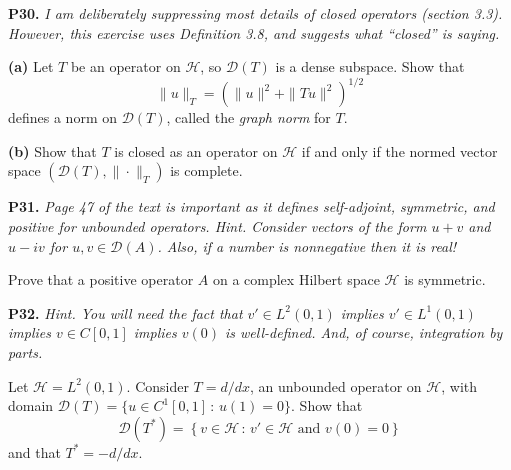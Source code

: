 \documentclass[12pt]{amsart}
\newcommand{\cD}{\mathcal{D}}
\newcommand{\cH}{\mathcal{H}}
\newcommand{\prob}[1]{\bigskip\noindent\textbf{#1.}\quad }
\newcommand{\epart}[1]{\medskip\noindent\textbf{(#1)}\quad }
\begin{document}
\prob{P30} \emph{I am deliberately suppressing most details of \emph{closed} operators (section 3.3).  However, this exercise uses Definition 3.8, and suggests what ``closed'' is saying.}

\epart{a} Let $T$ be an operator on $\cH$, so $\cD(T)$ is a dense subspace.  Show that
	$$\|u\|_T = \left(\|u\|^2 + \|Tu\|^2\right)^{1/2}$$
defines a norm on $\cD(T)$, called the \emph{graph norm} for $T$.

\epart{b} Show that $T$ is closed as an operator on $\cH$ if and only if the normed vector space $(\cD(T),\|\cdot\|_T)$ is complete.


\clearpage\newpage
\prob{P31} \emph{Page 47 of the text is important as it defines \emph{self-adjoint}, \emph{symmetric}, and \emph{positive} for unbounded operators.  Hint. Consider vectors of the form $u+v$ and $u-iv$ for $u,v\in\cD(A)$.  Also, if a number is nonnegative then it is real!}

\medskip\noindent Prove that a positive operator $A$ on a complex Hilbert space $\cH$ is symmetric.


\prob{P32}  \emph{Hint.  You will need the fact that $v' \in L^2(0,1)$ implies $v' \in L^1(0,1)$ implies $v \in C[0,1]$ implies $v(0)$ is well-defined.  And, of course, integration by parts.}

\medskip\noindent Let $\cH=L^2(0,1)$.  Consider $T=d/dx$, an unbounded operator on $\cH$, with domain $\cD(T) = \{u\in C^1[0,1]\,:\,u(1)=0\}$.  Show that
    $$\cD(T^*) = \left\{v\in \cH\,:\,v'\in\cH \text{ and } v(0)=0\right\}$$
and that $T^*=-d/dx$.
\end{document}
